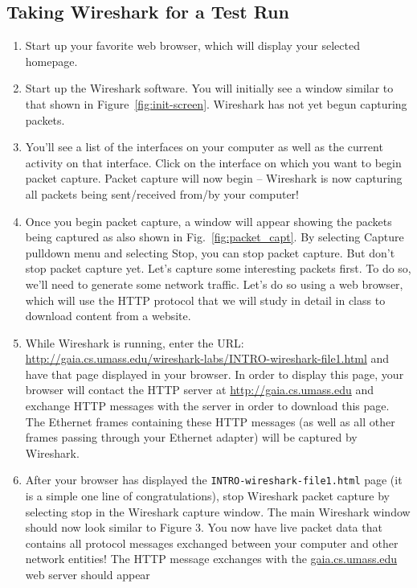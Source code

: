 \documentclass[11pt,a4paper]{article}
\begin{document}
\subsection{Taking Wireshark for a Test Run}

\begin{enumerate}
    \item Start up your favorite web browser, which will display your selected homepage.
    \item Start up the Wireshark software. You will initially see a window similar to that
    shown in Figure~\ref{fig:init-screen}. Wireshark has not yet begun capturing packets.
    \item You’ll see a list of the interfaces on your computer as well as the current activity on that interface. Click on the
    interface on which you want to begin packet capture. Packet capture will now begin -- Wireshark is now
    capturing all packets being sent/received from/by your computer!
    \item Once you begin packet capture, a window will
    appear showing the packets being captured as also shown in Fig.~\ref{fig:packet_capt}. By selecting Capture
    pulldown menu and selecting Stop, you can stop packet capture. But don’t stop
    packet capture yet. 
    Let's capture some interesting packets first. To do so, we'll
    need to generate some network traffic. Let’s do so using a web browser, which
    will use the HTTP protocol that we will study in detail in class to download
    content from a website.
    \item While Wireshark is running, enter the URL:
    \url{http://gaia.cs.umass.edu/wireshark-labs/INTRO-wireshark-file1.html}
    and have that page displayed in your browser. In order to display this page, your
    browser will contact the HTTP server at \url{http://gaia.cs.umass.edu} and exchange HTTP
    messages with the server in order to download this page. The Ethernet frames containing these HTTP messages (as well as all other frames passing through your Ethernet adapter) will be captured by Wireshark.
    \item After your browser has displayed the \texttt{INTRO-wireshark-file1.html} page (it is a
    simple one line of congratulations), stop Wireshark packet capture by selecting
    stop in the Wireshark capture window. The main Wireshark window should now
    look similar to Figure 3. You now have live packet data that contains all protocol
    messages exchanged between your computer and other network entities! The
    HTTP message exchanges with the \url{gaia.cs.umass.edu} web server should appear

\end{enumerate}
\end{document}
